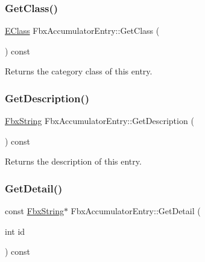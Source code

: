 \subsubsection{\texorpdfstring{Get\+Class()}{GetClass()}}
{\footnotesize\ttfamily \hyperlink{class_fbx_accumulator_entry_af08af3ddcbf7e8fe642d7e9ecb4ad0e2}{E\+Class} Fbx\+Accumulator\+Entry\+::\+Get\+Class (\begin{DoxyParamCaption}{ }\end{DoxyParamCaption}) const}



Returns the category class of this entry. 

\mbox{\label{class_fbx_accumulator_entry_a37cfbde3b74cda66945b948b4d6acd7c}} 
\subsubsection{\texorpdfstring{Get\+Description()}{GetDescription()}}
{\footnotesize\ttfamily \hyperlink{class_fbx_string}{Fbx\+String} Fbx\+Accumulator\+Entry\+::\+Get\+Description (\begin{DoxyParamCaption}{ }\end{DoxyParamCaption}) const}



Returns the description of this entry. 

\mbox{\label{class_fbx_accumulator_entry_a1698d2ce0b959f30b912716a893cf274}} 
\subsubsection{\texorpdfstring{Get\+Detail()}{GetDetail()}}
{\footnotesize\ttfamily const \hyperlink{class_fbx_string}{Fbx\+String}$\ast$ Fbx\+Accumulator\+Entry\+::\+Get\+Detail (\begin{DoxyParamCaption}\item[{int}]{id }\end{DoxyParamCaption}) const}

